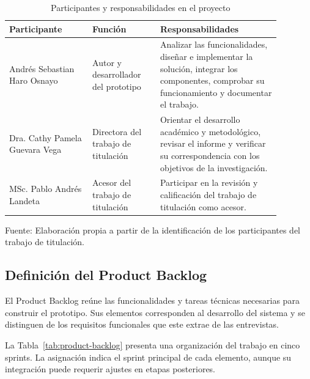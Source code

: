 \begin{table}[H]
    \centering
    \caption{Participantes y responsabilidades en el proyecto}
    \label{tab:participantes-proyecto}
    \small
    \renewcommand{\arraystretch}{1.25}
    \begin{tabular}{|p{0.27\linewidth}|p{0.22\linewidth}|p{0.39\linewidth}|}
        \hline
        \textbf{Participante} &
        \textbf{Función} &
        \textbf{Responsabilidades} \\
        \hline

        Andrés Sebastian Haro Osnayo &
        Autor y desarrollador del prototipo &
        Analizar las funcionalidades, diseñar e implementar
        la solución, integrar los componentes, comprobar
        su funcionamiento y documentar el trabajo. \\
        \hline

        Dra. Cathy Pamela Guevara Vega &
        Directora del trabajo de titulación &
        Orientar el desarrollo académico y metodológico,
        revisar el informe y verificar su correspondencia
        con los objetivos de la investigación. \\
        \hline

        MSc. Pablo Andrés Landeta &
        Acesor del trabajo de titulación &
        Participar en la revisión y calificación del
        trabajo de titulación como acesor. \\
        \hline
    \end{tabular}

    \par\smallskip
    \begin{minipage}{0.95\linewidth}
        \footnotesize
        Fuente: Elaboración propia a partir de la
        identificación de los participantes del
        trabajo de titulación.
    \end{minipage}
\end{table}



\subsection{Definición del Product Backlog}

El Product Backlog reúne las funcionalidades y tareas
técnicas necesarias para construir el prototipo. Sus
elementos corresponden al desarrollo del sistema y se
distinguen de los requisitos funcionales que este
extrae de las entrevistas.

La Tabla~\ref{tab:product-backlog} presenta una organización
del trabajo en cinco sprints. La asignación indica
el sprint principal de cada elemento, aunque su integración
puede requerir ajustes en etapas posteriores.

